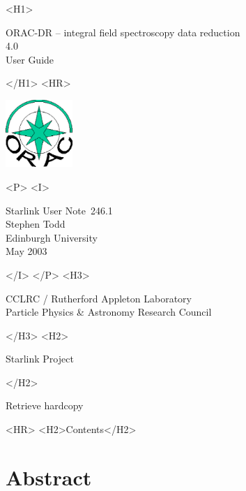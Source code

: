 \documentclass[twoside,11pt]{article}
\newcommand{\stardoccategory}  {Starlink User Note}
\newcommand{\stardocsource}    {sun\stardocnumber}
\newcommand{\stardocnumber}    {246.1}
\newcommand{\stardocauthors}   {Stephen Todd \\
                                Edinburgh University}
\newcommand{\stardocdate}      {May 2003}
\newcommand{\stardoctitle}     {ORAC-DR -- integral field spectroscopy
  data reduction}
\newcommand{\stardocversion}   {4.0}
\newcommand{\stardocmanual}    {User Guide}
\newcommand{\htmladdnormallink}[2]{#1}
\newcommand{\htmladdimg}[1]{}
\newcommand{\htmlref}[2]{#1}
\newcommand{\htmladdtonavigation}[1]{}
\newcommand{\xlabel}[1]{}
\renewcommand{\_}{\texttt{\symbol{95}}}
\begin{document}
\begin{htmlonly}
   \xlabel{}
   \begin{rawhtml} <H1> \end{rawhtml}
      \stardoctitle\\
      \stardocversion\\
      \stardocmanual
   \begin{rawhtml} </H1> <HR> \end{rawhtml}

\includegraphics[width=1.0in]{orac_logo.eps}

   \begin{rawhtml} <P> <I> \end{rawhtml}
   \stardoccategory\ \stardocnumber \\
   \stardocauthors \\
   \stardocdate
   \begin{rawhtml} </I> </P> <H3> \end{rawhtml}
      \htmladdnormallink{CCLRC / Rutherford Appleton Laboratory}
                        {http://www.cclrc.ac.uk} \\
      \htmladdnormallink{Particle Physics \& Astronomy Research Council}
                        {http://www.pparc.ac.uk} \\
   \begin{rawhtml} </H3> <H2> \end{rawhtml}
      \htmladdnormallink{Starlink Project}{http://www.starlink.rl.ac.uk/}
   \begin{rawhtml} </H2> \end{rawhtml}
   \htmladdnormallink{\htmladdimg{source.gif} Retrieve hardcopy}
      {http://www.starlink.rl.ac.uk/cgi-bin/hcserver?\stardocsource}\\

  \label{stardoccontents}
  \begin{rawhtml} 
    <HR>
    <H2>Contents</H2>
  \end{rawhtml}
  \htmladdtonavigation{\htmlref{\htmladdimg{contents_motif.gif}}
        {stardoccontents}}

  \section{\xlabel{abstract}Abstract}
\end{htmlonly}
\end{document}
